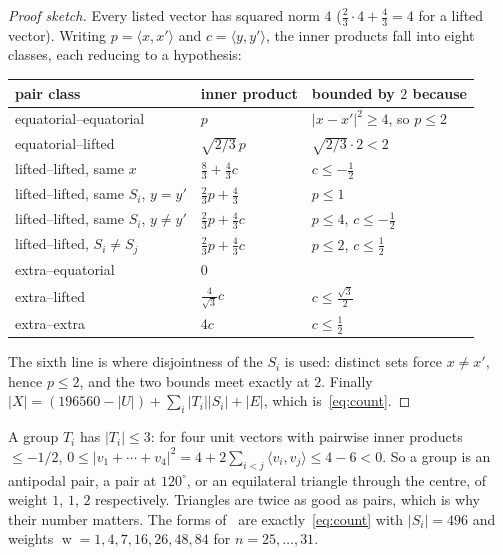 \documentclass[11pt,reqno]{amsart}
\theoremstyle{plain}
\theoremstyle{remark}
\newcommand{\ip}[2]{\langle #1, #2\rangle}
\DeclareMathOperator{\wt}{w}
\begin{document}
\begin{proof}[Proof sketch]
Every listed vector has squared norm $4$
($\tfrac23\cdot4 + \tfrac43 = 4$ for a lifted vector).  Writing
$p = \ip{x}{x'}$ and $c = \ip{y}{y'}$, the inner products fall into eight classes,
each reducing to a hypothesis:
\begin{center}
\begin{tabular}{@{}lll@{}}
\toprule
pair class & inner product & bounded by $2$ because \\
\midrule
equatorial--equatorial & $p$ & $|x-x'|^{2} \ge 4$, so $p \le 2$ \\
equatorial--lifted & $\sqrt{2/3}\,p$ & $\sqrt{2/3}\cdot 2 < 2$ \\
lifted--lifted, same $x$ & $\tfrac83 + \tfrac43 c$ & $c \le -\tfrac12$ \\
lifted--lifted, same $S_{i}$, $y = y'$ & $\tfrac23 p + \tfrac43$ & $p \le 1$ \\
lifted--lifted, same $S_{i}$, $y \ne y'$ & $\tfrac23 p + \tfrac43 c$
   & $p \le 4$, $c \le -\tfrac12$ \\
lifted--lifted, $S_{i} \ne S_{j}$ & $\tfrac23 p + \tfrac43 c$
   & $p \le 2$, $c \le \tfrac12$ \\
extra--equatorial & $0$ & \\
extra--lifted & $\tfrac{4}{\sqrt3}c$ & $c \le \tfrac{\sqrt3}{2}$ \\
extra--extra & $4c$ & $c \le \tfrac12$ \\
\bottomrule
\end{tabular}
\end{center}
The sixth line is where disjointness of the $S_{i}$ is used: distinct sets force
$x \ne x'$, hence $p \le 2$, and the two bounds meet exactly at $2$.  Finally
$|X| = (196560 - |U|) + \sum_{i}|T_{i}||S_{i}| + |E|$, which is~\eqref{eq:count}.
\end{proof}

A group $T_{i}$ has $|T_{i}| \le 3$: for four unit vectors with pairwise inner
products $\le -1/2$,
$0 \le |v_{1}+\cdots+v_{4}|^{2} = 4 + 2\sum_{i<j}\ip{v_{i}}{v_{j}} \le 4-6 < 0$.
So a group is an antipodal pair, a pair at $120^{\circ}$, or an equilateral
triangle through the centre, of weight $1$, $1$, $2$ respectively.  Triangles are
twice as good as pairs, which is why their number matters.  The forms
of~\cite{Ma2025} are exactly~\eqref{eq:count} with $|S_{i}| = 496$ and weights
$\wt = 1,4,7,16,26,48,84$ for $n = 25,\dots,31$.

\end{document}
